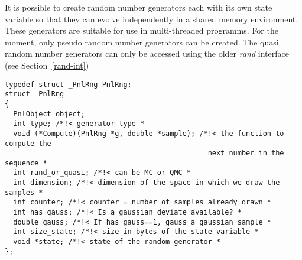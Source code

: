 It is possible to create random number generators each with its own state
variable so that they can evolve independently in a shared memory
environment. These generators are suitable for use in multi-threaded programms. For the
moment, only pseudo random number generators can be created. The quasi random
number generators can only be accessed using the older {\em rand} interface
(see Section~\ref{rand-int})

\begin{verbatim}
typedef struct _PnlRng PnlRng;
struct _PnlRng
{
  PnlObject object;
  int type; /*!< generator type *
  void (*Compute)(PnlRng *g, double *sample); /*!< the function to compute the
                                                next number in the sequence *
  int rand_or_quasi; /*!< can be MC or QMC *
  int dimension; /*!< dimension of the space in which we draw the samples *
  int counter; /*!< counter = number of samples already drawn *
  int has_gauss; /*!< Is a gaussian deviate available? *
  double gauss; /*!< If has_gauss==1, gauss a gaussian sample *
  int size_state; /*!< size in bytes of the state variable *
  void *state; /*!< state of the random generator *
};
\end{verbatim}


